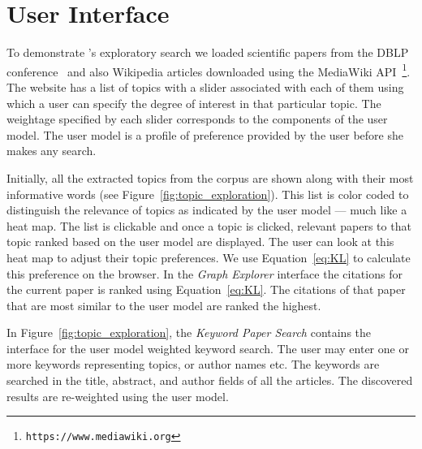 
\section{User Interface}
\label{sec:demo}


To demonstrate \system's exploratory search we loaded scientific 
papers from the DBLP conference~\cite{Tang:2008:EMA:1367497.1367722} 
and also Wikipedia articles downloaded using the MediaWiki API~\footnote{\texttt{https://www.mediawiki.org}}.
The {\system} website has a list of topics with a slider associated 
with each of them using which a user can specify the degree of 
interest in that particular topic. The weightage specified by each 
slider corresponds to the components of the user model. The user 
model is a profile of preference provided by the user before she 
makes any search.

Initially, all the extracted topics from the corpus are shown along 
with their most informative words (see Figure~\ref{fig:topic_exploration}).
This list is color coded to distinguish the relevance of topics as indicated by the user model --- much like a heat map.
The list is clickable and once a topic is clicked, relevant papers to that topic ranked based on the user model are displayed.
The user can look at this heat map to adjust their topic preferences.
We use Equation~\ref{eq:KL} to calculate this preference on the \system browser. 
In the \textsl{Graph Explorer} interface the citations for the current paper is ranked
using Equation~\ref{eq:KL}. The citations of that paper that are most
similar to the user model are ranked the highest.


In Figure~\ref{fig:topic_exploration}, the \textsl{Keyword Paper 
Search} contains the interface for the user model weighted keyword search.
The user may enter one or more keywords representing topics, or 
author names etc. The keywords are searched in the title, abstract, 
and author fields of all the articles. The discovered results are  
re-weighted using the user model. 

